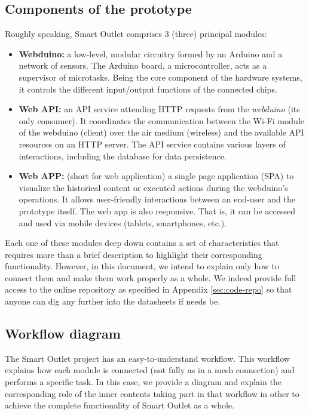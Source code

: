 \subsection{Components of the prototype}
Roughly speaking, Smart Outlet comprises 3 (three) principal modules:
\begin{itemize}
    \item \textbf{Webduino:} a low-level, modular circuitry formed by an Arduino and a network of sensors. The Arduino board, a microcontroller, acts as a supervisor of microtasks. Being the core component of the hardware systems, it controls the different input/output functions of the connected chips.
    \item \textbf{Web API:} an API service attending HTTP requests from the \emph{webduino} (its only consumer). It coordinates the communication between the Wi-Fi module of the webduino (client) over the air medium (wireless) and the available API resources on an HTTP server. The API service contains various layers of interactions, including the database for data persistence.
    \item \textbf{Web APP:} (short for web application) a single page application (SPA) to visualize the historical content or executed actions during the webduino's operations. It allows user-friendly interactions between an end-user and the prototype itself. The web app is also responsive. That is, it can be accessed and used via mobile devices (tablets, smartphones, etc.).
\end{itemize}

Each one of these modules deep down contains a set of characteristics that
requires more than a brief description to highlight their corresponding
functionality. However, in this document, we intend to explain only how to connect
them and make them work properly as a whole. We indeed provide full
access to the online repository as specified in Appendix \ref{sec:code-repo} so
that anyone can dig any further into the datasheets if needs be.

\subsection{Workflow diagram}
The Smart Outlet project has an easy-to-understand workflow. This workflow explains how each module is connected (not fully as in a mesh connection) and performs a specific task. In this case, we provide a diagram and explain the corresponding role of the inner contents taking part in that workflow in other to achieve the complete functionality of Smart Outlet as a whole.

